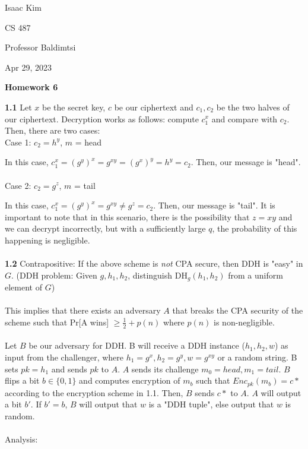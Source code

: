\documentclass[12pt]{article}
\begin{document}
\noindent Isaac Kim

\noindent CS 487

\noindent Professor Baldimtsi

\noindent Apr 29, 2023

\begin{center} 
\textbf{Homework 6}
\end{center}

\noindent \textbf{1.1} Let $x$ be the secret key, $c$ be our ciphertext and $c_1, c_2$ be the two halves of our ciphertext. Decryption works as follows: compute $c_1^x$ and compare with $c_2$. Then, there are two cases:
\\
Case 1: $c_2 = h^y$, $m$ = head

In this case, $c_1^x = (g^y)^x = g^{xy} = (g^x)^y = h^y = c_2$. Then, our message is "head".
\\
\\
Case 2: $c_2 = g^z$, $m$ = tail

In this case, $c_1^x = (g^y)^x = g^{xy} \neq g^z = c_2$. Then, our message is "tail". It is important to note that in this scenario, there is the possibility that $z = xy$ and we can decrypt incorrectly, but with a sufficiently large $q$, the probability of this happening is negligible.
\\
\\
\noindent \textbf{1.2} Contrapositive: If the above scheme is \emph{not} CPA secure, then DDH is "easy" in $G$. (DDH problem: Given $g, h_1, h_2$, distinguish DH$_g(h_1,h_2)$ from a uniform element of $G$)
\\
\\
This implies that there exists an adversary $A$ that breaks the CPA security of the scheme such that Pr[A wins] $\geq \frac{1}{2} + p(n)$ where $p(n)$ is non-negligible.
\\
\\
Let $B$ be our adversary for DDH. B will receive a DDH instance ($h_1, h_2, w$) as input from the challenger, where $h_1 = g^x, h_2 = g^y, w = g^{xy}$ or a random string. B sets $pk = h_1$ and sends $pk$ to $A$. $A$ sends its challenge $m_0 = head, m_1 = tail$. $B$ flips a bit $b \in \{0,1\}$ and computes encryption of $m_b$ such that $Enc_{pk}(m_b) = c*$ according to the encryption scheme in 1.1. Then, $B$ sends $c*$ to $A$. $A$ will output a bit $b'$. If $b' = b$, $B$ will output that $w$ is a "DDH tuple", else output that $w$ is random.
\\
\\
Analysis:
\end{document}
